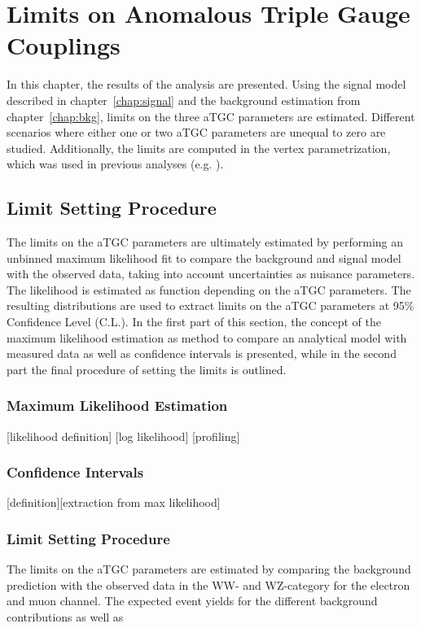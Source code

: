 \chapter{Limits on Anomalous Triple Gauge Couplings}
\label{chap:LimitsonATGCs}


In this chapter, the results of the analysis are presented. Using the signal model described in chapter~\ref{chap:signal} and the background estimation from chapter~\ref{chap:bkg}, limits on the three aTGC parameters are estimated. Different scenarios where either one or two aTGC parameters are unequal to zero are studied. Additionally, the limits are computed in the vertex parametrization, which was used in previous analyses (e.g. \cite{aTGC1,aTGC2}).


\section{Limit Setting Procedure}
The limits on the aTGC parameters are ultimately estimated by performing an unbinned maximum likelihood fit to compare the background and signal model with the observed data, taking into account uncertainties as nuisance parameters. The likelihood is estimated as function depending on the aTGC parameters. The resulting distributions are used to extract limits on the aTGC parameters at 95\% Confidence Level (C.L.). In the first part of this section, the concept of the maximum likelihood estimation as method to compare an analytical model with measured data as well as confidence intervals is presented, while in the second part the final procedure of setting the limits is outlined.
\subsection{Maximum Likelihood Estimation}
\label{subsec:maxlikeest}
[likelihood definition]
[log likelihood]
[profiling]
\subsection{Confidence Intervals}
[definition][extraction from max likelihood]
\subsection{Limit Setting Procedure}
The limits on the aTGC parameters are estimated by comparing the background prediction with the observed data in the WW- and WZ-category for the electron and muon channel. The expected event yields for the different background contributions as well as 



